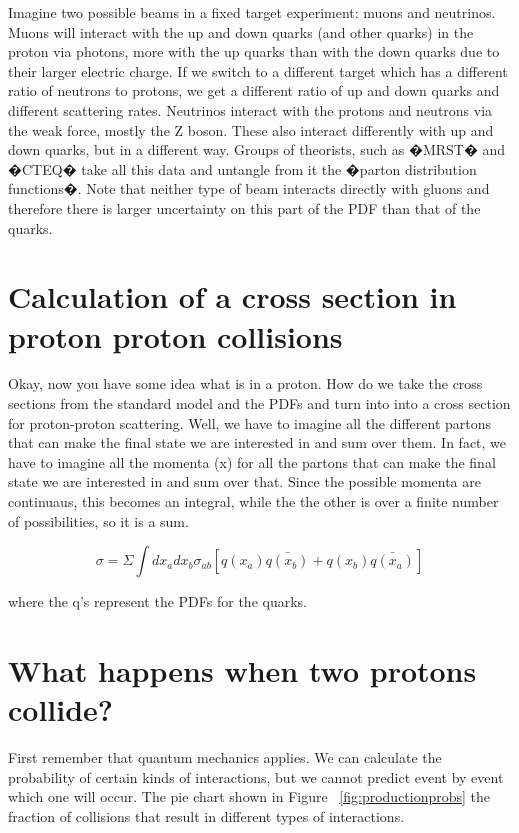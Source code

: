 Imagine two possible beams in a fixed target experiment: muons and neutrinos.  Muons will interact with the up and down quarks (and other quarks) in the  proton via photons, more with the up quarks than with the down quarks due to their larger electric charge.  If we switch to a different target which has a different ratio of neutrons to protons, we get a different ratio of up and down quarks and different scattering rates.  Neutrinos interact with the protons and neutrons via the weak force, mostly the Z boson.  These also interact differently with up and down quarks, but in a different way.  Groups of theorists, such as �MRST� and �CTEQ� take all this data and untangle from it the �parton distribution functions�.  Note that neither type of beam interacts directly with gluons and therefore there is larger uncertainty on this part of the PDF than that of the quarks.

\section{Calculation of a cross section in proton proton collisions}

Okay, now you have some idea what is in a proton.  How do we take the cross sections from the standard model and the PDFs and turn into into a cross section for proton-proton scattering.  Well, we have to imagine all the different partons that can make the final state we are interested in and sum over them.  In fact, we have to imagine all the momenta (x) for all the partons that can make the final state we are interested in and sum over that.  Since the possible momenta are continuaus, this becomes an integral, while the the other is over a finite number of possibilities, so it is a sum.



\begin{equation}
\sigma = \Sigma \int{dx_a dx_b \sigma_{ab}[q(x_a)\bar{q(x_b)}+q(x_b)\bar{q(x_a)}]}
\end{equation}

where the q's represent the PDFs for the quarks.

\section{What happens when two protons collide?}
First remember that quantum mechanics applies.  We can calculate the probability of certain kinds of interactions, but we cannot predict event by event which one will occur.  The pie chart shown in Figure ~\ref{fig:productionprobs} the fraction of collisions that result in different types of interactions.

